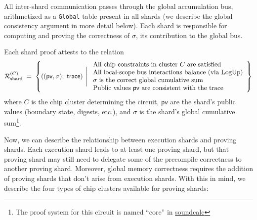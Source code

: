 \documentclass[11pt]{article}
\begin{document}
All inter-shard communication passes through the global
accumulation bus, arithmetized as a \texttt{Global} table present in all shards (we describe the global
consistency argument in more detail below).
Each shard is responsible for computing and proving the correctness of $\sigma$, its contribution to the
global bus.

Each shard proof attests to the relation
$$
\mathcal{R}_{\mathrm{shard}}^{(C)} \;=\; \left\{
\left((\mathsf{pv},\sigma);\; \mathsf{trace}\right) \;\Bigg|\;
\begin{array}{l}
\text{All chip constraints in cluster $C$ are satisfied}\\
\text{All local-scope bus interactions balance (via LogUp)}\\
\sigma \text{ is the correct global cumulative sum}\\
\text{Public values $\mathsf{pv}$ are consistent with the trace}
\end{array}
\right\}
$$
where $C$ is the chip cluster determining the circuit, $\mathsf{pv}$ are the shard's public values
(boundary state, digests, etc.), and $\sigma$ is the shard's global cumulative sum\footnote{The proof system
for this circuit is named ``core'' in \href{https://github.com/ethereum/soundcalc/blob/main/soundcalc/zkvms/sp1/sp1.toml}{soundcalc}}.

Now, we can describe the relationship between execution shards and proving shards.
Each execution shard leads to at least one proving shard, but that proving shard may still need
to delegate some of the precompile correctness to another proving shard.
Moreover, global memory correctness requires the addition of proving shards that don't arise from
execution shards.
With this in mind, we describe the four types of chip clusters available for proving shards:
\end{document}
